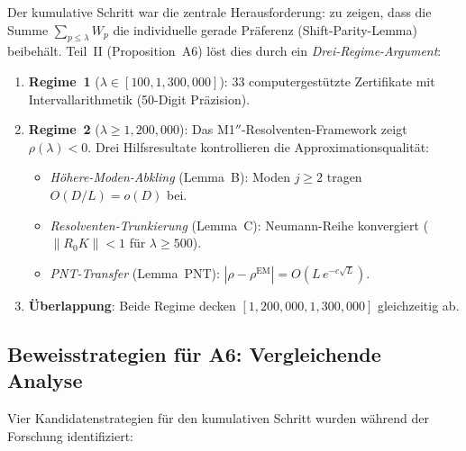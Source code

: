 \documentclass[12pt,a4paper]{article}
\theoremstyle{definition}
\theoremstyle{remark}
\begin{document}
Der kumulative Schritt war die zentrale Herausforderung: zu zeigen, dass die Summe $\sum_{p \leq \lambda} W_p$ die individuelle gerade Präferenz (Shift-Parity-Lemma) beibehält. Teil~II (Proposition~A6) löst dies durch ein \emph{Drei-Regime-Argument}:

\begin{enumerate}
  \item \textbf{Regime~1} ($\lambda \in [100, 1{,}300{,}000]$): $33$ computergestützte Zertifikate mit Intervallarithmetik (50-Digit Präzision).
  \item \textbf{Regime~2} ($\lambda \geq 1{,}200{,}000$): Das M1$''$-Resolventen-Framework zeigt $\rho(\lambda) < 0$. Drei Hilfsresultate kontrollieren die Approximationsqualität:
  \begin{itemize}
    \item \emph{Höhere-Moden-Abkling} (Lemma~B): Moden $j \geq 2$ tragen $O(D/L) = o(D)$ bei.
    \item \emph{Resolventen-Trunkierung} (Lemma~C): Neumann-Reihe konvergiert ($\|R_0 K\| < 1$ für $\lambda \geq 500$).
    \item \emph{PNT-Transfer} (Lemma~PNT): $|\rho - \rho^{\mathrm{EM}}| = O(L\,e^{-c\sqrt{L}})$.
  \end{itemize}
  \item \textbf{Überlappung}: Beide Regime decken $[1{,}200{,}000, 1{,}300{,}000]$ gleichzeitig ab.
\end{enumerate}

\subsection{Beweisstrategien für A6: Vergleichende Analyse}

Vier Kandidatenstrategien für den kumulativen Schritt wurden während der Forschung identifiziert:

\begin{center}
\footnotesize
\renewcommand{\arraystretch}{1.25}
\end{center}
\end{document}
